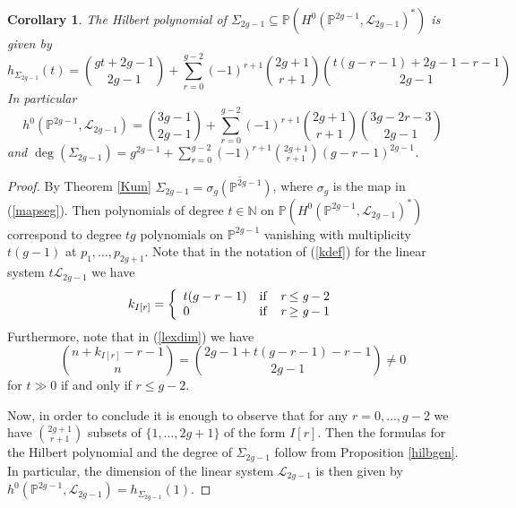 \documentclass[a4paper,10pt]{amsart}
\newtheorem{Corollary}[thm]{Corollary}
\theoremstyle{definition}
\begin{document}
\begin{Corollary}\label{hilbseg}
The Hilbert polynomial of $\Sigma_{2g-1}\subseteq \mathbb{P}(H^0(\mathbb{P}^{2g-1},\mathcal{L}_{2g-1})^{*})$ is given by 
$$h_{\Sigma_{2g-1}}(t) = \binom{gt+2g-1}{2g-1}+\sum_{r=0}^{g-2}(-1)^{r+1}\binom{2g+1}{r+1}\binom{t(g-r-1)+2g-1-r-1}{2g-1}$$
In particular
$$h^0(\mathbb{P}^{2g-1},\mathcal{L}_{2g-1}) = \binom{3g-1}{2g-1}+\sum_{r=0}^{g-2}(-1)^{r+1}\binom{2g+1}{r+1}\binom{3g-2r-3}{2g-1}$$
and $\deg(\Sigma_{2g-1})= g^{2g-1}+\sum_{r=0}^{g-2}(-1)^{r+1}\binom{2g+1}{r+1}(g-r-1)^{2g-1}$.
\end{Corollary}
\begin{proof}
By Theorem \ref{Kum} $\Sigma_{2g-1} = \overline{\sigma_g(\mathbb{P}^{2g-1})}$, where $\sigma_g$ is the map in (\ref{mapseg}). Then polynomials of degree $t\in\mathbb{N}$ on $\mathbb{P}(H^0(\mathbb{P}^{2g-1},\mathcal{L}_{2g-1})^{*})$ correspond to degree $tg$ polynomials on $\mathbb{P}^{2g-1}$ vanishing with multiplicity $t(g-1)$ at $p_1,\dots,p_{2g+1}$. Note that in the notation of (\ref{kdef}) for the linear system $t\mathcal{L}_{2g-1}$ we have 
$$
k_{I[r]}=
\left\lbrace\begin{array}{ll}
t(g-r-1) & \rm{if}\quad \textit{r}\leq \textit{g}-2\\ 
0 & \rm{if} \quad \textit{r}\geq \textit{g}-1
\end{array}\right. 
$$
Furthermore, note that in (\ref{lexdim}) we have
$$\binom{n+k_{I[r]}-r-1}{n} = \binom{2g-1+t(g-r-1)-r-1}{2g-1}\neq 0$$
for $t\gg 0$ if and only if $r\leq g-2$. 

Now, in order to conclude it is enough to observe that for any $r=0,\dots,g-2$ we have $\binom{2g+1}{r+1}$ subsets of $\{1,\dots,2g+1\}$ of the form $I[r]$. Then the formulas for the Hilbert polynomial and the degree of $\Sigma_{2g-1}$ follow from Proposition \ref{hilbgen}. In particular, the dimension of the linear system $\mathcal{L}_{2g-1}$ is then given by $h^0(\mathbb{P}^{2g-1},\mathcal{L}_{2g-1}) = h_{\Sigma_{2g-1}}(1)$.
\end{proof}
\end{document}
